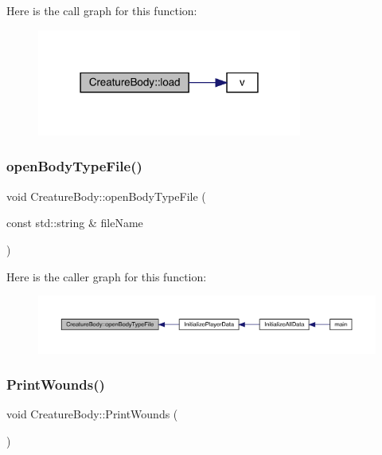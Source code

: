 Here is the call graph for this function\+:
\nopagebreak
\begin{figure}[H]
\begin{center}
\leavevmode
\includegraphics[width=247pt]{da/d7d/class_creature_body_a947efb646a893964de6244b886bab038_cgraph}
\end{center}
\end{figure}
\mbox{\label{class_creature_body_ac4140e081c8970ad4330c253c615ba33}} 
\subsubsection{\texorpdfstring{open\+Body\+Type\+File()}{openBodyTypeFile()}}
{\footnotesize\ttfamily void Creature\+Body\+::open\+Body\+Type\+File (\begin{DoxyParamCaption}\item[{const std\+::string \&}]{file\+Name }\end{DoxyParamCaption})}

Here is the caller graph for this function\+:
\nopagebreak
\begin{figure}[H]
\begin{center}
\leavevmode
\includegraphics[width=350pt]{da/d7d/class_creature_body_ac4140e081c8970ad4330c253c615ba33_icgraph}
\end{center}
\end{figure}
\mbox{\label{class_creature_body_a82e519351551538b1138fea170776f3f}} 
\subsubsection{\texorpdfstring{Print\+Wounds()}{PrintWounds()}}
{\footnotesize\ttfamily void Creature\+Body\+::\+Print\+Wounds (\begin{DoxyParamCaption}{ }\end{DoxyParamCaption})}

